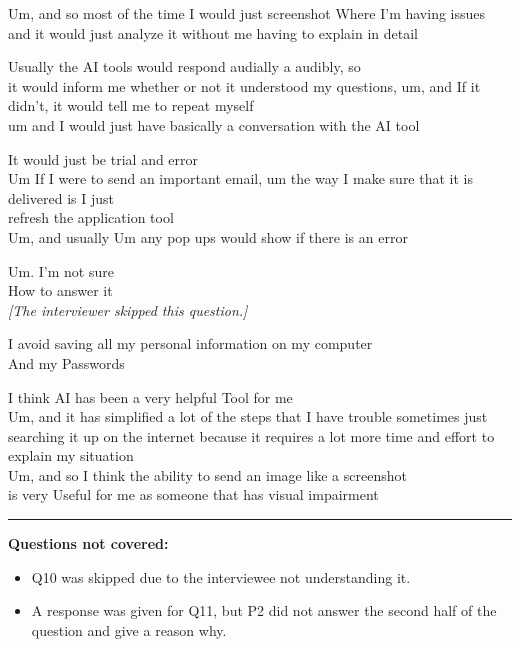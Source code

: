 \begin{description}[style=nextline,leftmargin=1.5em]
Um, and so most of the time I would just screenshot Where I'm having issues and it would just analyze it without me having to explain in detail
\item[P2 Q8.] Usually the AI tools would respond audially a audibly, so\\
it would inform me whether or not it understood my questions, um, and If it didn't, it would tell me to repeat myself\\
um and I would just have basically a conversation with the AI tool
\item[P2 Q9.] It would just be trial and error\\
Um If I were to send an important email, um the way I make sure that it is delivered is I just\\
refresh the application tool\\
Um, and usually Um any pop ups would show if there is an error
\item[P2 Q10.] Um. I'm not sure\\
How to answer it\\
\textit{[The interviewer skipped this question.]}
\item[P2 Q11.] I avoid saving all my personal information on my computer\\
And my Passwords
\item[P2 Q12.] I think AI has been a very helpful Tool for me\\
Um, and it has simplified a lot of the steps that I have trouble sometimes just searching it up on the internet because it requires a lot more time and effort to explain my situation\\
Um, and so I think the ability to send an image like a screenshot\\
is very Useful for me as someone that has visual impairment
\end{description}

\bigskip
\hrule
\bigskip

\textbf{Questions not covered:}
\begin{itemize}
\item
  Q10 was skipped due to the interviewee not understanding it.
\item
  A response was given for Q11, but P2 did not answer the second half of the question and give a reason why.
\end{itemize}
